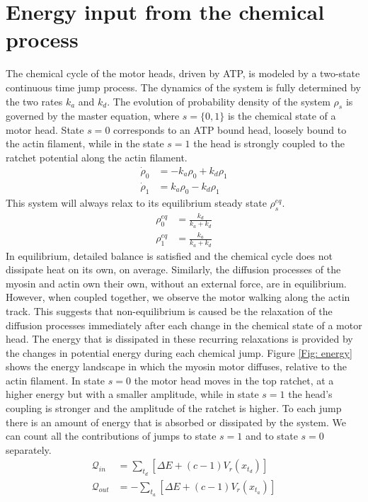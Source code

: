 \documentclass[aps,pre,twocolumn,showpacs,showkeys,a4paper]{revtex4}
\begin{document}
\section{Energy input from the chemical process}

The chemical cycle of the motor heads, driven by ATP, is modeled by a two-state continuous time jump process. 
The dynamics of the system is fully determined by the two rates $k_a$ and $k_d$. 
The evolution of probability density of the system $\rho_s$ is governed by the master equation, where $s = \{0,1\}$ is the chemical state of a motor head. 
State $s=0$ corresponds to an ATP bound head, loosely bound to the actin filament, while in the state $s=1$ the head is strongly coupled to the ratchet potential along the actin filament.
\begin{align*}
\dot{\rho}_0 &= -k_a \rho_0 + k_d \rho_1 \\
\dot{\rho}_1 &= k_a \rho_0 - k_d \rho_1 
\end{align*}
This system will always relax to its equilibrium steady state $\rho^{eq}_s$.
\begin{align*}
\rho^{eq}_0 &= \frac{k_d}{k_a+k_d}\\
\rho^{eq}_1 &= \frac{k_a}{k_a+k_d} 
\end{align*}
In equilibrium, detailed balance is satisfied and the chemical cycle does not dissipate heat on its own, on average.
Similarly, the diffusion processes of the myosin and actin own their own, without an external force, are in equilibrium.
However, when coupled together, we observe the motor walking along the actin track. 
This suggests that non-equilibrium is caused be the relaxation of the diffusion processes immediately after each change in the chemical state of a motor head. 
The energy that is dissipated in these recurring relaxations is provided by the changes in potential energy during each chemical jump. 
Figure \ref{Fig: energy} shows the energy landscape in which the myosin motor diffuses, relative to the actin filament. 
In state $s=0$ the motor head moves in the top ratchet, at a higher energy but with a smaller amplitude, while in state $s=1$ the head's coupling is stronger and the amplitude of the ratchet is higher. 
To each jump there is an amount of energy that is absorbed or dissipated by the system. 
We can count all the contributions of jumps to state $s=1$ and to state $s=0$ separately.
\begin{align}
\mathcal Q_{in} &= \sum_{t_d} \left[ \Delta E + (c-1) V_r(x_{t_d}) \right]  \label{q_in} \\
\mathcal Q_{out} &= -\sum_{t_a} \left[ \Delta E + (c-1) V_r(x_{t_a}) \right]  \label{q_out}
\end{align}
\end{document}
